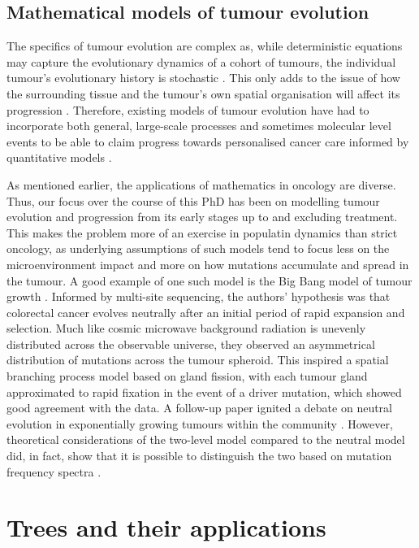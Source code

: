 \subsection{Mathematical models of tumour evolution}
The specifics of tumour evolution are complex as, while deterministic equations may capture the evolutionary
dynamics of a cohort of tumours, the individual tumour's evolutionary history is stochastic
\cite{werner_deterministic_2013}. This only adds to the issue of how the surrounding tissue \cite{west_normal_2021}
and the tumour's own spatial organisation will affect its progression \cite{noble_spatial_2022}. Therefore,
existing models of tumour evolution have had to incorporate both general, large-scale processes and
sometimes molecular level events to be able to claim progress towards personalised cancer care informed
by quantitative models \cite{yin_review_2019}. \par
As mentioned earlier, the applications of mathematics in oncology are diverse. Thus, our focus over the course
of this PhD has been on modelling tumour evolution and progression from its early stages up to and excluding
treatment. This makes the problem more of an exercise in populatin dynamics than strict oncology, as underlying
assumptions of such models tend to focus less on the microenvironment impact and more on how mutations accumulate
and spread in the tumour. A good example of one such model is the Big Bang model of tumour growth \cite{sottoriva_big_2015}.
Informed by multi-site sequencing, the authors' hypothesis was that colorectal cancer evolves neutrally after an initial
period of rapid expansion and selection. Much like cosmic microwave background radiation is unevenly distributed across the
observable universe, they observed an asymmetrical distribution of mutations across the tumour spheroid.
This inspired a spatial branching process model based on gland fission, with each tumour gland approximated to
rapid fixation in the event of a driver mutation, which showed good agreement with the data. A follow-up paper \cite{williams_identification_2016}
ignited a debate on neutral evolution in exponentially growing tumours within the community
\cite{tarabichi_neutral_2018, mcdonald_currently_2018, heide_reply_2018, bozic_measuring_2019}.
However, theoretical considerations of the two-level model compared to the neutral model did, in fact,
show that it is possible to distinguish the two based on mutation frequency spectra \cite{tung_signatures_2021}.


\section{Trees and their applications}

